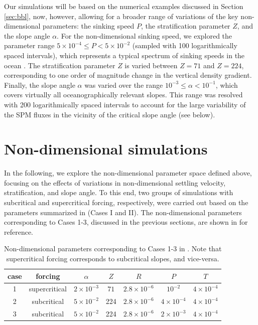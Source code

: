 Our simulations will be based on the numerical examples discussed in
Section \ref{sec:bbl}, now, however, allowing for a broader range of
variations of the key non-dimensional parameters: the sinking speed
$P$, the stratification parameter $Z$, and the slope angle
$\alpha$. For the non-dimensional sinking speed, we explored the
parameter range $5 \times 10^{-4} \leq P < 5 \times 10^{-2}$ (sampled
with 100 logarithmically spaced intervals), which represents a typical
spectrum of sinking speeds in the ocean
\citep[e.g.,][]{Ferguson2004,vanLeussen1988}. The stratification
parameter $Z$ is varied between $Z=71$ and $Z=224$, corresponding to
one order of magnitude change in the vertical density
gradient. Finally, the slope angle $\alpha$ was varied over the range
$10^{-3} \leq \alpha < 10^{-1}$, which covers virtually all
oceanographically relevant slopes. This range was resolved with 200
logarithmically spaced intervals to account for the large variability
of the SPM fluxes in the vicinity of the critical slope angle (see
below).  

\section{Non-dimensional simulations\label{sec:results}}
In the following, we explore the non-dimensional parameter space
defined above, focusing on the effects of variations in
non-dimensional settling velocity, stratification, and slope angle. To
this end, two groups of simulations with subcritical and supercritical
forcing, respectively, were carried out based on the parameters
summarized in  (Cases I and II). The non-dimensional parameters
corresponding to Cases 1-3, discussed in the previous sections, are
shown in  for reference.

\begin{table}[h]
\caption{Non-dimensional parameters corresponding to Cases 1-3 in
  . Note that supercritical forcing corresponds to
  subcritical slopes, and vice-versa.}\label{paramsNDa}
\begin{center}
\begin{tabular}{ccccccc}
\hline\hline
case & forcing & $\alpha$ & $Z$ & $R$ & $P$ & $T$ \\
\hline
1 & supercritical & $2 \times 10^{-3}$ & $71$ & $2.8 \times 10^{-6}$ & $10^{-2}$ & $4 \times 
10^{-4}$ \\
\hline
2 & subcritical & $5 \times 10^{-2}$ & 224 & 
$2.8 \times 10^{-6}$ & $4 \times 10^{-4}$ &  $4 \times 10^{-4}$ \\
\hline
3 & subcritical & $5 \times 10^{-2}$ & 224 & 
$2.8 \times 10^{-6}$ & $2 \times 10^{-3}$ &  $4 \times 10^{-4}$ \\
\hline
\end{tabular}
\end{center}
\end{table}

